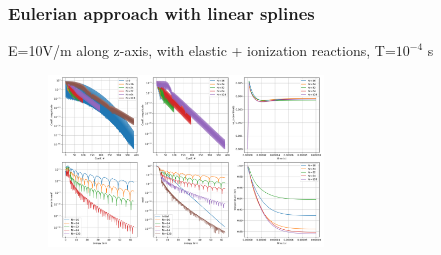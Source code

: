 \documentclass[mathserif, aspectratio=169]{beamer}
\begin{document}
\begin{frame}
	\frametitle{Eulerian approach with linear splines}
	E=10V/m along z-axis, with elastic + ionization reactions, T=$10^{-4}$ s
	\begin{figure}
		\includegraphics[width=0.65\textwidth]{figures/b_1ev_10Vpm_vspace_coeff.png}
	\end{figure}
\end{frame}





\end{document}
